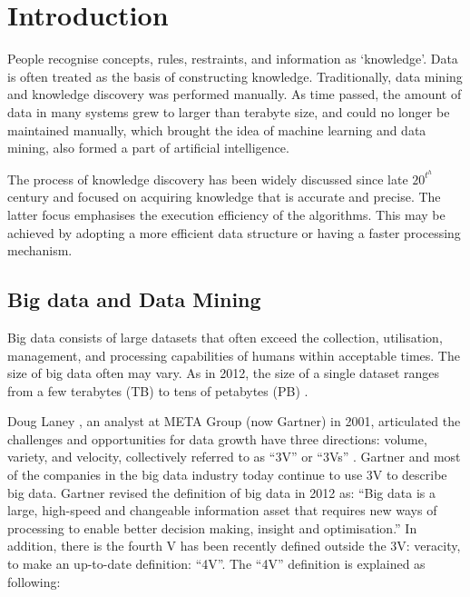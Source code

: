 \chapter{Introduction} \label{chapt:Introduction}
People recognise concepts, rules, restraints, and information as `knowledge'. Data is often treated as the basis of constructing knowledge. Traditionally, data mining and knowledge discovery was performed manually. As time passed, the amount of data in many systems grew to larger than terabyte size, and could no longer be maintained manually, which brought the idea of machine learning and data mining, also formed a part of artificial intelligence.


The process of knowledge discovery has been widely discussed since late $20^t^h$ century and focused on acquiring knowledge that is accurate and precise. The latter focus emphasises the execution efficiency of the algorithms. This may be achieved by adopting a more efficient data structure or having a faster processing mechanism.

\section{Big data and Data Mining}

Big data consists of large datasets that often exceed the collection, utilisation, management, and processing capabilities of humans within acceptable times. The size of big data often may vary. As in 2012, the size of a single dataset ranges from a few terabytes (TB) to tens of petabytes (PB) \cite{wiki:bigdata}.

Doug Laney \cite{bigdata}, an analyst at META Group (now Gartner) in 2001, articulated the challenges and opportunities for data growth have three directions: volume, variety, and velocity, collectively referred to as ``3V'' or ``3Vs'' \cite{bigdata}. Gartner and most of the companies in the big data industry today continue to use 3V to describe big data. Gartner revised the definition of big data in 2012 as: ``Big data is a large, high-speed and changeable information asset that requires new ways of processing to enable better decision making, insight and optimisation.'' In addition, there is the fourth V has been recently defined outside the 3V: veracity, to make an up-to-date definition: ``4V''. The ``4V'' definition is explained as following:

